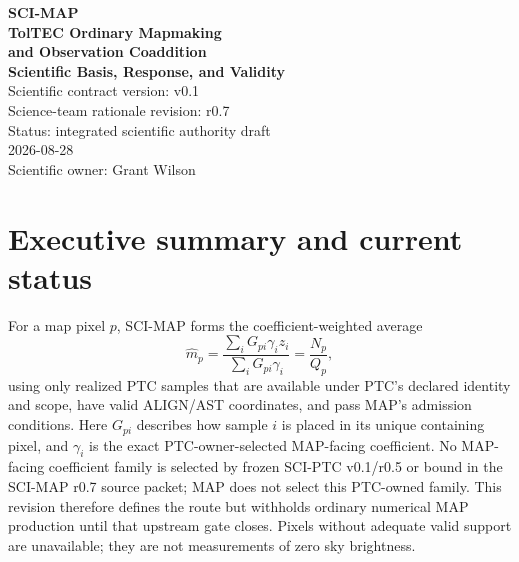 \documentclass[10pt]{article}
\begin{document}
\begin{titlepage}
\centering\vspace*{0.48in}
{\Large\color{MapBlue}\textbf{SCI-MAP}}\\[0.18in]
{\huge\color{MapNavy}\textbf{TolTEC Ordinary Mapmaking}}\\[0.08in]
{\LARGE\color{MapNavy}\textbf{and Observation Coaddition}}\\[0.10in]
{\Large\color{MapBlue}\textbf{Scientific Basis, Response, and Validity}}\\[0.38in]
{\large Scientific contract version: v0.1}\\[0.06in]
{\large Science-team rationale revision: r0.7}\\[0.06in]
{\large Status: integrated scientific authority draft}\\[0.08in]
{\large 2026-08-28}\\[0.42in]
\vfill {\large Scientific owner: Grant Wilson}
\end{titlepage}

\section*{Executive summary and current status}
For a map pixel \(p\), SCI-MAP forms the coefficient-weighted average
\begin{equation}
 \widehat m_p=\frac{\sum_iG_{pi}\gamma_i z_i}
                         {\sum_iG_{pi}\gamma_i}
 =\frac{N_p}{Q_p},
 \label{eq:map}
\end{equation}
using only realized PTC samples that are available under PTC's declared
identity and scope, have valid ALIGN/AST coordinates, and pass MAP's admission
conditions. Here \(G_{pi}\) describes how
sample \(i\) is placed in its unique containing pixel, and \(\gamma_i\) is the
exact PTC-owner-selected MAP-facing coefficient. No MAP-facing coefficient
family is selected by frozen SCI-PTC v0.1/r0.5 or bound in the SCI-MAP r0.7
source packet; MAP does not select this PTC-owned family. This revision
therefore defines the route but withholds ordinary numerical MAP production
until that upstream gate closes. Pixels without adequate valid support
are unavailable; they are not measurements of zero sky brightness.
\end{document}
